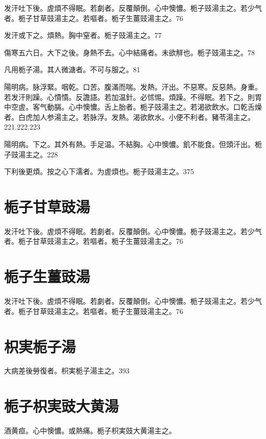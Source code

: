 \documentclass[12pt,twoside,UTF8,b5paper]{ctexbook}
\begin{document}
发汗吐下後。虗煩不得眠。若劇者。反覆顛倒。心中懊憹。栀子{豉}湯主之。若少气者。栀子甘草{豉}湯主之。若嘔者。栀子生薑{豉}湯主之。76

发汗或下之。煩熱。胸中窒者。栀子{豉}湯主之。77

傷寒五六日。大下之後。身熱不去。心中結痛者。未欲觧也。栀子{豉}湯主之。78

凡用栀子湯。其人微溏者。不可与服之。81

陽明病。脉浮緊。咽乾。口苦。腹滿而喘。发熱。汗出。不惡寒。反惡熱。身重。若发汗則躁。心憒憒。反譫語。若加温針。必怵惕。煩躁。不得眠。若下之。則胃中空虗。客气動膈。心中懊憹。舌上胎者。栀子{豉}湯主之。若渴欲飲水。口乾舌燥者。白虎{加人参}湯主之。若脉浮。发熱。渴欲飲水。小便不利者。豬苓湯主之。221.222.223

陽明病。下之。其外有熱。手足温。不結胸。心中懊憹。飢不能食。但頭汗出。栀子{豉}湯主之。228

下利後更煩。按之心下濡者。为虗煩也。栀子{豉}湯主之。375

\section{栀子甘草豉湯}

发汗吐下後。虗煩不得眠。若劇者。反覆顛倒。心中懊憹。栀子{豉}湯主之。若少气者。栀子甘草{豉}湯主之。若嘔者。栀子生薑{豉}湯主之。76

\section{栀子生薑豉湯}

发汗吐下後。虗煩不得眠。若劇者。反覆顛倒。心中懊憹。栀子{豉}湯主之。若少气者。栀子甘草{豉}湯主之。若嘔者。栀子生薑{豉}湯主之。76

\section{枳実栀子湯}

大病差後勞復者。枳実栀子湯主之。393

\section{栀子枳実豉大黄湯}

酒黄疸。心中懊憹。或熱痛。栀子{枳実豉}大黄湯主之。
\end{document}
